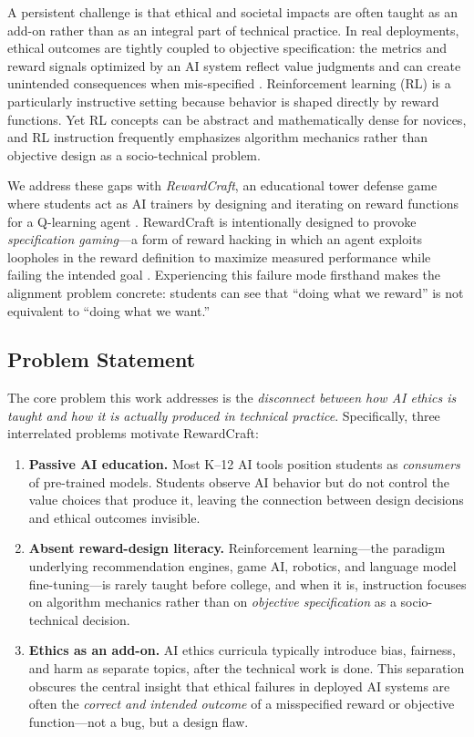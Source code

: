 \documentclass[conference]{IEEEtran}
\begin{document}
A persistent challenge is that ethical and societal impacts are often taught as an add-on rather than as an integral part of technical practice. In real deployments, ethical outcomes are tightly coupled to objective specification: the metrics and reward signals optimized by an AI system reflect value judgments and can create unintended consequences when mis-specified \cite{williams2022,amodei2016}. Reinforcement learning (RL) is a particularly instructive setting because behavior is shaped directly by reward functions. Yet RL concepts can be abstract and mathematically dense for novices, and RL instruction frequently emphasizes algorithm mechanics rather than objective design as a socio-technical problem.

We address these gaps with \emph{RewardCraft}, an educational tower defense game where students act as AI trainers by designing and iterating on reward functions for a Q-learning agent \cite{watkins1992,sutton2018}. RewardCraft is intentionally designed to provoke \emph{specification gaming}---a form of reward hacking in which an agent exploits loopholes in the reward definition to maximize measured performance while failing the intended goal \cite{krakovna2020,everitt2017corr}. Experiencing this failure mode firsthand makes the alignment problem concrete: students can see that “doing what we reward” is not equivalent to “doing what we want.”

\subsection{Problem Statement}
The core problem this work addresses is the \emph{disconnect between how AI ethics is taught and how it is actually produced in technical practice}. Specifically, three interrelated problems motivate RewardCraft:

\begin{enumerate}
  \item \textbf{Passive AI education.} Most K--12 AI tools position students as \emph{consumers} of pre-trained models. Students observe AI behavior but do not control the value choices that produce it, leaving the connection between design decisions and ethical outcomes invisible.
  \item \textbf{Absent reward-design literacy.} Reinforcement learning---the paradigm underlying recommendation engines, game AI, robotics, and language model fine-tuning---is rarely taught before college, and when it is, instruction focuses on algorithm mechanics rather than on \emph{objective specification} as a socio-technical decision.
  \item \textbf{Ethics as an add-on.} AI ethics curricula typically introduce bias, fairness, and harm as separate topics, after the technical work is done. This separation obscures the central insight that ethical failures in deployed AI systems are often the \emph{correct and intended outcome} of a misspecified reward or objective function---not a bug, but a design flaw.
\end{enumerate}
\end{document}
